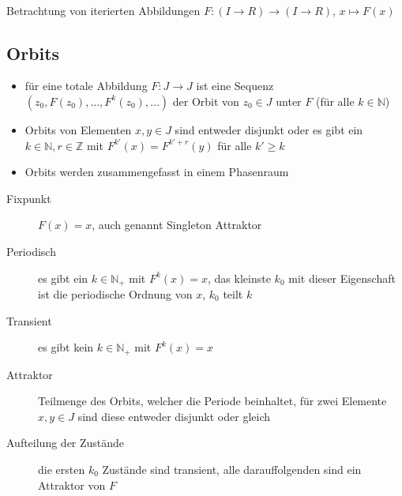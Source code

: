 \vspace*{-0.5\baselineskip}\\
Betrachtung von iterierten Abbildungen $F:(I\rightarrow R)\rightarrow(I\rightarrow R)$, $x\mapsto F(x)$\\
\vspace*{-0.5\baselineskip}
\subsection{Orbits}
	\begin{itemize}
		\item für eine totale Abbildung $F:J\rightarrow J$ ist eine Sequenz $(z_0,F(z_0),\dots,F^k(z_0),\dots)$ der Orbit von $z_0\in J$ unter $F$ (für alle $k\in \mathbb{N}$)
		\item Orbits von Elementen $x,y\in J$ sind entweder disjunkt oder es gibt ein $k\in\mathbb{N},r\in \mathbb{Z}$ mit $F^{k'}(x)=F^{k'+r}(y)$ für alle $k'\geq k$
		\item Orbits werden zusammengefasst in einem Phasenraum
	\end{itemize}
	\begin{description}
		\item[Fixpunkt] $F(x)=x$, auch genannt \glqq Singleton Attraktor\grqq
		\item[Periodisch] es gibt ein $k\in\mathbb{N}_+$ mit $F^k(x)=x$, das kleinste $k_0$ mit dieser Eigenschaft ist die periodische Ordnung von $x$, $k_0$ teilt $k$
		\item[Transient] es gibt kein $k\in\mathbb{N}_+$ mit $F^k(x)=x$
		\item[Attraktor] Teilmenge des Orbits, welcher die Periode beinhaltet, für zwei Elemente $x,y\in J$ sind diese entweder disjunkt oder gleich
		\item[Aufteilung der Zustände] die ersten $k_0$ Zustände sind transient, alle darauffolgenden sind ein Attraktor von $F$
	\end{description}
\topbreak
\vspace*{-2\baselineskip}
